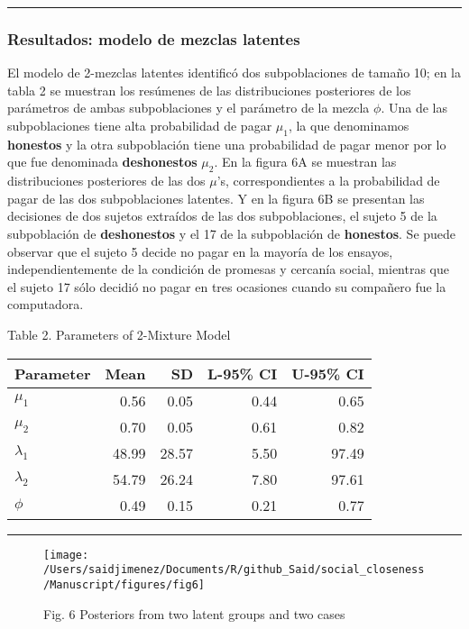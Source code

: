 \documentclass[]{article}
\begin{document}
\begin{center}\rule{0.5\linewidth}{\linethickness}\end{center}

\subsubsection{Resultados: modelo de mezclas
latentes}\label{resultados-modelo-de-mezclas-latentes}

El modelo de 2-mezclas latentes identificó dos subpoblaciones de tamaño
10; en la tabla 2 se muestran los resúmenes de las distribuciones
posteriores de los parámetros de ambas subpoblaciones y el parámetro de
la mezcla \(\phi\). Una de las subpoblaciones tiene alta probabilidad de
pagar \(\mu_1\), la que denominamos \textbf{honestos} y la otra
subpoblación tiene una probabilidad de pagar menor por lo que fue
denominada \textbf{deshonestos} \(\mu_2\). En la figura 6A se muestran
las distribuciones posteriores de las dos \(\mu\)'s, correspondientes a
la probabilidad de pagar de las dos subpoblaciones latentes. Y en la
figura 6B se presentan las decisiones de dos sujetos extraídos de las
dos subpoblaciones, el sujeto 5 de la subpoblación de
\textbf{deshonestos} y el 17 de la subpoblación de \textbf{honestos}. Se
puede observar que el sujeto 5 decide no pagar en la mayoría de los
ensayos, independientemente de la condición de promesas y cercanía
social, mientras que el sujeto 17 sólo decidió no pagar en tres
ocasiones cuando su compañero fue la computadora.

Table 2. Parameters of 2-Mixture Model

\begin{longtable}[]{@{}lrrrr@{}}
\toprule
Parameter & Mean & SD & L-95\% CI & U-95\% CI\tabularnewline
\midrule
\endhead
\(\mu_{1}\) & 0.56 & 0.05 & 0.44 & 0.65\tabularnewline
\(\mu_{2}\) & 0.70 & 0.05 & 0.61 & 0.82\tabularnewline
\(\lambda_{1}\) & 48.99 & 28.57 & 5.50 & 97.49\tabularnewline
\(\lambda_{2}\) & 54.79 & 26.24 & 7.80 & 97.61\tabularnewline
\(\phi\) & 0.49 & 0.15 & 0.21 & 0.77\tabularnewline
\bottomrule
\end{longtable}

\begin{center}\rule{0.5\linewidth}{\linethickness}\end{center}

\begin{figure}

{\centering \texttt{[image: /Users/saidjimenez/Documents/R/github\_Said/social\_closeness/Manuscript/figures/fig6]} 

}

\caption{Fig. 6 Posteriors from two latent groups and two cases}\label{fig:fig6}
\end{figure}
\end{document}
